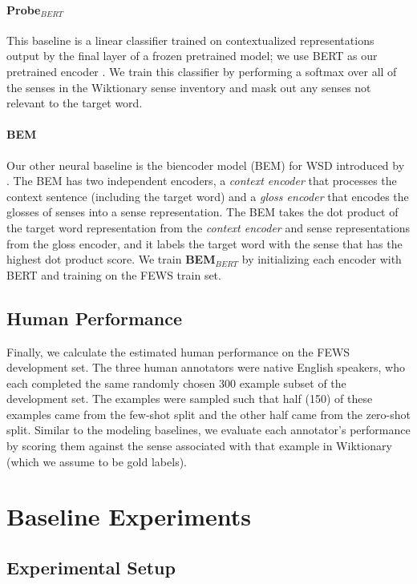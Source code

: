 \documentclass[11pt,a4paper]{article}
\begin{document}
\paragraph{Probe$_{BERT}$} This baseline is a linear classifier trained on contextualized representations output by the final layer of a frozen pretrained model; we use BERT as our pretrained encoder \cite{devlin2019bert}. We train this classifier by performing a softmax over all of the senses in the Wiktionary sense inventory and mask out any senses not relevant to the target word.

\paragraph{\textbf{BEM}} Our other neural baseline is the biencoder model (BEM) for WSD introduced by \citet{blevins2020moving}. The BEM has two independent encoders, a \textit{context encoder} that processes the context sentence (including the target word) and a \textit{gloss encoder} that encodes the glosses of senses into a sense representation. The BEM takes the dot product of the target word representation from the \textit{context encoder} and sense representations from the gloss encoder, and it labels the target word with the sense that has the highest dot product score. We train \textbf{BEM$_{BERT}$} by initializing each encoder with BERT and training on the FEWS train set.

\subsection{Human Performance} Finally, we calculate the estimated human performance on the FEWS development set. The three human annotators were native English speakers, who each completed the same randomly chosen 300 example subset of the development set. The examples were sampled such that half (150) of these examples came from the few-shot split and the other half came from the zero-shot split. Similar to the modeling baselines, we evaluate each annotator's performance by scoring them against the sense associated with that example in Wiktionary (which we assume to be gold labels).

\section{Baseline Experiments}
\subsection{Experimental Setup}
\label{baseline-exp-setup}
\end{document}
